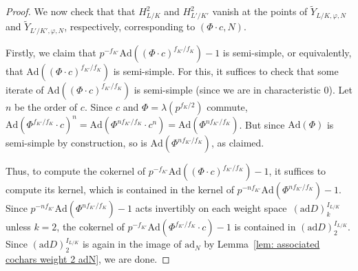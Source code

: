 \documentclass{amsart}
\def\Ad{\mathrm{Ad}}
\def\ad{\mathrm{ad}}
\theoremstyle{definition}
\theoremstyle{remark}
\begin{document}
\begin{proof}
We now check that that $H_{L/K}^2$ and  $H_{L'/K'}^2$ vanish at the points of $\widetilde{Y}_{L/K,\varphi,N}$ and $\widetilde{Y}_{L'/K',\varphi,N}$, respectively, corresponding to $(\Phi\cdot c,N)$.

  Firstly, we claim that $p^{-f_{K'}}\Ad((\Phi\cdot c)^{f_{K'}/f_K})-1$ is
  semi-simple, or equivalently, that
  $\Ad((\Phi\cdot c)^{f_{K'}/f_K})$ is semi-simple.  For this,
  it suffices to check that some iterate of
  $\Ad((\Phi\cdot c)^{f_{K'}/f_K})$ is semi-simple (since we are in
  characteristic $0$).  Let $n$ be the order of $c$.  Since $c$ and
  $\Phi=\lambda(p^{f_{K}/2})$ commute,
  $\Ad(\Phi^{f_{K'}/f_K}\cdot c)^n=\Ad(\Phi^{nf_{K'}/f_K}\cdot
  c^n)=\Ad(\Phi^{nf_{K'}/f_K})$.  But since $\Ad(\Phi)$ is semi-simple
  by construction, so is $\Ad(\Phi^{nf_{K'}/f_K})$, as claimed.

  Thus, to compute the cokernel of
  $p^{-f_{K'}}\Ad((\Phi\cdot c)^{f_{K'}/f_K})-1$, it suffices to
  compute its kernel, which is contained in the kernel of
  $p^{-nf_{K'}}\Ad(\Phi^{nf_{K'}/f_K})-1$.  Since
  $p^{-nf_{K'}}\Ad(\Phi^{nf_{K'}/f_K})-1$ acts invertibly on each
  weight space~$(\ad D)^{I_{L/K}}_k$ unless $k=2$, the cokernel of
  $p^{-f_{K'}}\Ad(\Phi^{f_{K'}/f_K}\cdot c)-1$ is contained in
  $(\ad D)^{I_{L/K}}_2$.  Since $(\ad D)^{I_{L/K}}_2$ is again in the
  image of $\ad_N$ by Lemma~\ref{lem: associated cochars weight 2
    adN}, %
  we are done.
\end{proof}
\end{document}
